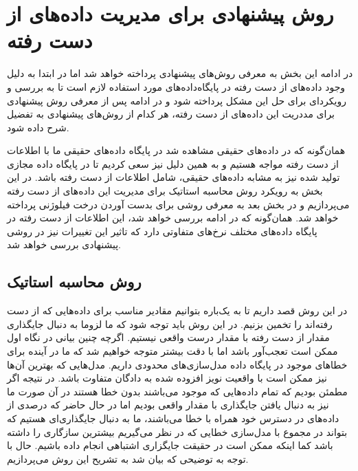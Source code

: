 \section{روش پیشنهادی برای مدیریت داده‌های از دست رفته}

در ادامه این بخش به معرفی روش‌های پیشنهادی پرداخته خواهد شد اما در ابتدا به دلیل وجود داده‌های از دست رفته در پایگاه‌داده‌های مورد استفاده لازم است تا به بررسی و رویکردای برای حل این مشکل پرداخته شود و در ادامه پس از معرفی روش پیشنهادی برای مددریت این داده‌های از دست رفته، هر کدام از روش‌های پیشنهادی به تفضیل شرح داده شود.

همان‌گونه که در داده‌های حقیقی مشاهده شد در پایگاه داده‌های حقیقی ما با اطلاعات از دست رفته مواجه هستیم و به همین دلیل نیز سعی کردیم تا در پایگاه داده مجازی تولید شده نیز به مشابه داده‌های حقیقی، شامل اطلاعات از دست رفته باشد. در این بخش به رویکرد روش محاسبه استاتیک برای مدیریت این داده‌های از دست رفته می‌پردازیم و در بخش بعد به معرفی روشی برای بدست آوردن درخت فیلوژنی پرداخته خواهد شد. همان‌گونه که در ادامه بررسی خواهد شد، این اطلاعات از دست رفته در پایگاه داده‌های مختلف نرخ‌های متفاوتی دارد که تاثیر این تغییرات نیز در روشی پیشنهادی بررسی خواهد شد.

\subsection{روش محاسبه استاتیک}
در این روش قصد داریم تا به یک‌باره بتوانیم مقادیر مناسب برای داده‌هایی که از دست رفته‌اند را تخمین بزنیم. در این روش باید توجه شود که ما لزوما به دنبال جایگذاری مقدار از دست رفته با مقدار درست واقعی نیستیم. اگرچه چنین بیانی در نگاه اول ممکن است تعجب‌آور باشد اما با دقت بیشتر متوجه خواهیم شد که ما در آینده برای خطاهای موجود در پایگاه داده مدل‌سازی‌های محدودی داریم. مدل‌هایی که بهترین آن‌ها نیز ممکن است با واقعیت نویز افزوده شده به دادگان متفاوت باشد. در نتیجه اگر مطمئن بودیم که تمام داده‌هایی که موجود می‌باشند بدون خطا هستند در آن صورت ما نیز به دنبال یافتن جایگذاری با مقدار واقعی بودیم اما در حال حاضر که درصدی از داده‌های در دسترس خود همراه با خطا می‌باشند، ما به دنبال جایگذاری‌ای هستیم که بتواند در مجموع با مدل‌سازی خطایی که در نظر می‌گیریم بیشترین سازگاری را داشته باشد کما اینکه ممکن است در حقیقت جایگزاری اشتباهی انجام داده باشیم. حال با توجه به توضیحی که بیان شد به تشریح این روش می‌پردازیم.

